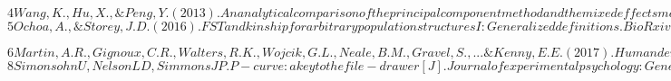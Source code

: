 \documentclass[12pt]{article}
\theoremstyle{definition}
\theoremstyle{plain}
\begin{document}
$
4
Wang, K., Hu, X., \& Peng, Y. (2013). An analytical comparison of the principal component method and the mixed effects model for association studies in the presence of cryptic relatedness and population stratification. Human heredity, 76(1), 1-9.
$\\



$
5
Ochoa, A., \& Storey, J. D. (2016). FST and kinship for arbitrary population structures I: Generalized definitions. BioRxiv, 083915.
$

$
6
Martin, A. R., Gignoux, C. R., Walters, R. K., Wojcik, G. L., Neale, B. M., Gravel, S., ... \& Kenny, E. E. (2017). Human demographic history impacts genetic risk prediction across diverse populations. The American Journal of Human Genetics, 100(4), 635-649.
$\\



$
8
Simonsohn U, Nelson L D, Simmons J P. P-curve: a key to the file-drawer[J]. Journal of experimental psychology: General, 2014, 143(2): 534.
$
\end{document}
